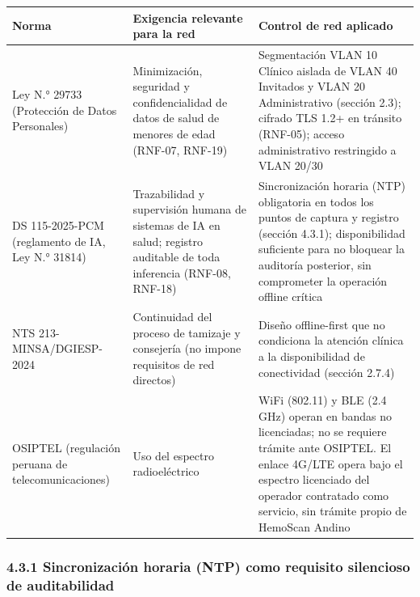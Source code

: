 \documentclass[11pt,a4paper]{article}
\begin{document}
{\small
\begin{longtable}[]{@{}
  >{\raggedright\arraybackslash}p{}
  >{\raggedright\arraybackslash}p{}
  >{\raggedright\arraybackslash}p{}@{}}
\toprule\noalign{}
\begin{minipage}[b]{\linewidth}\raggedright
Norma
\end{minipage} & \begin{minipage}[b]{\linewidth}\raggedright
Exigencia relevante para la red
\end{minipage} & \begin{minipage}[b]{\linewidth}\raggedright
Control de red aplicado
\end{minipage} \\
\midrule\noalign{}
\endhead
\bottomrule\noalign{}
\endlastfoot
Ley N.° 29733 (Protección de Datos Personales) & Minimización, seguridad y confidencialidad de datos de salud de menores de edad (RNF-07, RNF-19) & Segmentación VLAN 10 Clínico aislada de VLAN 40 Invitados y VLAN 20 Administrativo (sección 2.3); cifrado TLS 1.2+ en tránsito (RNF-05); acceso administrativo restringido a VLAN 20/30 \\
DS 115-2025-PCM (reglamento de IA, Ley N.° 31814) & Trazabilidad y supervisión humana de sistemas de IA en salud; registro auditable de toda inferencia (RNF-08, RNF-18) & Sincronización horaria (NTP) obligatoria en todos los puntos de captura y registro (sección 4.3.1); disponibilidad suficiente para no bloquear la auditoría posterior, sin comprometer la operación offline crítica \\
NTS 213-MINSA/DGIESP-2024 & Continuidad del proceso de tamizaje y consejería (no impone requisitos de red directos) & Diseño offline-first que no condiciona la atención clínica a la disponibilidad de conectividad (sección 2.7.4) \\
OSIPTEL (regulación peruana de telecomunicaciones) & Uso del espectro radioeléctrico & WiFi (802.11) y BLE (2.4 GHz) operan en bandas no licenciadas; no se requiere trámite ante OSIPTEL. El enlace 4G/LTE opera bajo el espectro licenciado del operador contratado como servicio, sin trámite propio de HemoScan Andino \\
\end{longtable}
}

\subsubsection{4.3.1 Sincronización horaria (NTP) como requisito silencioso de auditabilidad}\label{sincronizaciuxf3n-horaria-ntp-como-requisito-silencioso-de-auditabilidad}
\end{document}
